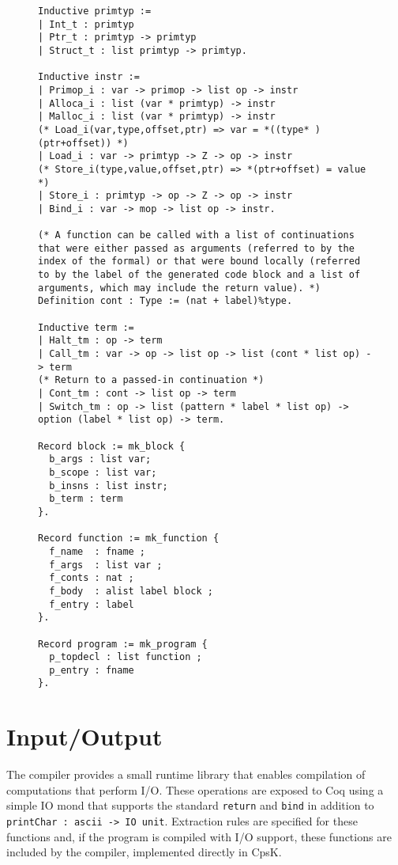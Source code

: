 \documentclass{article}
\begin{document}
\begin{figure}
\begin{lstlisting}
Inductive primtyp :=
| Int_t : primtyp
| Ptr_t : primtyp -> primtyp
| Struct_t : list primtyp -> primtyp.

Inductive instr :=
| Primop_i : var -> primop -> list op -> instr
| Alloca_i : list (var * primtyp) -> instr
| Malloc_i : list (var * primtyp) -> instr
(* Load_i(var,type,offset,ptr) => var = *((type* )(ptr+offset)) *)
| Load_i : var -> primtyp -> Z -> op -> instr
(* Store_i(type,value,offset,ptr) => *(ptr+offset) = value *)
| Store_i : primtyp -> op -> Z -> op -> instr
| Bind_i : var -> mop -> list op -> instr.

(* A function can be called with a list of continuations that were either passed as arguments (referred to by the index of the formal) or that were bound locally (referred to by the label of the generated code block and a list of arguments, which may include the return value). *)
Definition cont : Type := (nat + label)%type.

Inductive term :=
| Halt_tm : op -> term
| Call_tm : var -> op -> list op -> list (cont * list op) -> term
(* Return to a passed-in continuation *)
| Cont_tm : cont -> list op -> term
| Switch_tm : op -> list (pattern * label * list op) -> option (label * list op) -> term.

Record block := mk_block {
  b_args : list var;
  b_scope : list var;
  b_insns : list instr;
  b_term : term
}.

Record function := mk_function {
  f_name  : fname ;
  f_args  : list var ;
  f_conts : nat ;
  f_body  : alist label block ; 
  f_entry : label
}.

Record program := mk_program {
  p_topdecl : list function ;
  p_entry : fname
}.
\end{lstlisting}
\end{figure}

\section{Input/Output}
\label{sec:io}

The compiler provides a small runtime library that enables compilation of computations that perform I/O. These operations are exposed to Coq using a simple IO mond that supports the standard \verb!return! and \lstinline!bind! in addition to \lstinline!printChar : ascii -> IO unit!. Extraction rules are specified for these functions and, if the program is compiled with I/O support, these functions are included by the compiler, implemented directly in CpsK.
\end{document}
